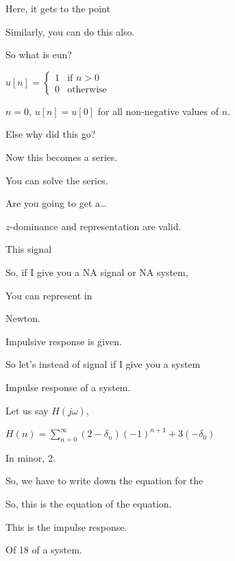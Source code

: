 \documentclass{article}
\begin{document}
Here, it gets to the point







Similarly, you can do this also.

So what is eun?

$u[n] = \begin{cases} 
1 & \text{if } n > 0 \\
0 & \text{otherwise}
\end{cases}$

$n = 0$, $u[n] = u[0]$ for all non-negative values of $n$.

Else why did this go?



Now this becomes a series.

You can solve the series.

Are you going to get a…



$z$-dominance and representation are valid.

This signal

So, if I give you a NA signal or NA system,

You can represent in

Newton.

Impulsive response is given.

So let's instead of signal if I give you a system

Impulse response of a system.

Let us say $H(j\omega)$,

$H(n) = \sum_{n=0}^{\infty} (2 - \delta_n)(-1)^{n+1} + 3(-\delta_0)$

In minor, 2.

So, we have to write down the equation for the

So, this is the equation of the equation.

This is the impulse response.

Of 18 of a system.
\end{document}
